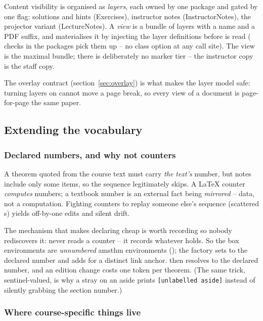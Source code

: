 Content visibility is organised as \emph{layers}, each owned by one
package and gated by one flag: solutions and hints (Exercises),
instructor notes (InstructorNotes), the projector variant (LectureNotes).
A \emph{view} is a bundle of layers with a name and a PDF suffix, and
 materialises it by injecting the layer definitions
before  is read ( checks in the packages
pick them up -- no class option at any call site). The 
view is the maximal bundle; there is deliberately no marker tier -- the
instructor copy is the staff copy.

The overlay contract (section~\ref{sec:overlay}) is what makes the
layer model safe: turning layers on cannot move a page break, so every
view of a document is page-for-page the same paper.

\subsection{Extending the vocabulary}\label{sec:extending}

\subsubsection*{Declared numbers, and why not counters}

A theorem quoted from the course text must carry \emph{the text's}
number, but notes include only some items, so the sequence legitimately
skips. A LaTeX counter \emph{computes} numbers; a textbook number is an
external fact being \emph{mirrored} -- data, not a computation. Fighting
counters to replay someone else's sequence (scattered s)
yields off-by-one edits and silent drift.

The mechanism that makes declaring cheap is worth recording so nobody
rediscovers it:  never reads a counter -- it records whatever
 holds. So the box environments are \emph{unnumbered}
amsthm environments (); the factory sets
 to the declared number and adds 
for a distinct link anchor.  then resolves to the declared
number, and an edition change costs one token per theorem. (The same
trick, sentinel-valued, is why a stray  on an aside prints
\texttt{[unlabelled aside]} instead of silently grabbing the section
number.)

\subsubsection*{Where course-specific things live}

